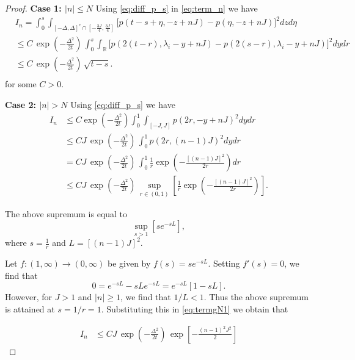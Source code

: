 \documentclass[10pt,a4paper]{amsart}
\begin{document}
\begin{proof}
\noindent
\textbf{Case 1: $|n|\le N$}
Using \eqref{eq:diff_p_s} in \eqref{eq:term_n} we have
\begin{align} \label{eq:termlN}
  & I_n =\int_{0}^{s}
    \int_{[-\Delta,\Delta]^c\cap\left[-\frac{3J}{4},\frac{3J}{4}\right]}
    \Big[p(t-s +\eta,-z+nJ)-p(\eta,-z+nJ)\Big]^2dzd\eta \nonumber\\
  &\le C\,\exp\left(-\frac{\Delta^2}{2t}\right)\, \int_0^s\int_{\mathbb{R}}
\Big[ p(2(t-r),{\lambda}_i-y+nJ) 
  - p(2(s-r),{\lambda}_i-y+nJ)\Big]^2dydr \nonumber\\
&\le C\,\exp\left(-\frac{\Delta^2}{2t}\right)\,\sqrt{t-s}. \nonumber \\  
\end{align}
for some $C>0$.

\textbf{Case 2: $|n|>N$}
Using \eqref{eq:diff_p_s} we have
\begin{align} \label{eq:termgN1} 
I_n & \leq C \exp\left(-\frac{\Delta^2}{2t}\right)\int_0^1 \int_{[-J,J]}  p(2r,-y+nJ)^2 dydr  \nonumber\\
&\le CJ\,\exp\left(-\frac{\Delta^2}{2t}\right)\,\int_0^1 p(2r,(n-1)J)^2 dydr  \nonumber \\
&= CJ\, \exp\left(-\frac{\Delta^2}{2t}\right)\,\int_0^1 
     \frac{1}{r}\exp\left(-\frac{[(n-1)J]^2}{2r}\right)dr  \nonumber\\
&\le CJ\,\exp\left(-\frac{\Delta^2}{2t}\right)\,\sup_{r\in(0,1)}
     \left[\frac{1}{r}\exp\left(-\frac{[(n-1)J]^2}{2r}\right)\right].
\end{align}

The above supremum is equal to 
\begin{equation*}
\sup_{s>1}\left[se^{-sL}\right],  
\end{equation*}
where $s=\frac{1}{r}$ and $L=[(n-1)J]^2.$

Let $f: (1,\infty) \rightarrow (0,\infty)$ be given by $f(s)=se^{-sL}$.  Setting $f'(s)=0$, we find that 
\begin{equation*}
0 = e^{-sL} - sLe^{-sL} = e^{-sL}[1-sL].  
\end{equation*}
However, for $J>1$ and $|n|\ge1$, we find that $1/L<1$. Thus the above supremum is attained at $s=1/r=1$. Substituting this in \eqref{eq:termgN1} we obtain that 

\begin{align} \label{eq:termgN}
I_n&\le CJ\,\exp\left(-\frac{\Delta^2}{2t}\right)\,\exp\left[-\frac{(n-1)^2J^2}{2}\right]  
\end{align}


\end{proof}
\end{document}
